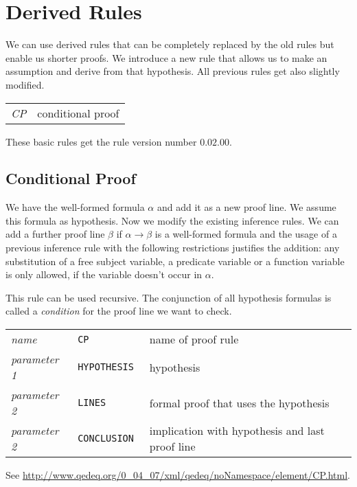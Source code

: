 \documentclass[a4paper,german,10pt,twoside]{book}
\theoremstyle{definition}
\theoremstyle{remark}
\begin{document}

\chapter{Derived Rules} \label{chapter7} \hypertarget{chapter7}{}

We can use derived rules that can be completely replaced by the old rules but enable us shorter proofs. We introduce a new rule that allows us to make an assumption and derive from that hypothesis. All previous rules get also slightly modified.

\par
\begin{tabularx}{\columnwidth}{ll}
  \emph{CP}          & conditional proof  \\
\end{tabularx}
  
\par
These basic rules get the rule version number $0.02.00$.

\section{Conditional Proof} \label{chapter7_section1} \hypertarget{chapter7_section1}{}
We have the well-formed formula $\alpha$ and add it as a new proof line. We assume this formula as hypothesis. Now we modify the existing inference rules. We can add a further proof line $\beta$ if $\alpha \rightarrow \beta$ is a well-formed formula and the usage of a previous inference rule with the following restrictions justifies the addition: any substitution of a free subject variable, a predicate variable or a function variable is only allowed, if the variable doesn't occur in $\alpha$.

\par
This rule can be used recursive. The conjunction of all hypothesis formulas is called a \emph{condition} for the proof line we want to check.

\par
\begin{tabularx}{\columnwidth}{lll}
  \emph{name}        & \tt{CP}          & name of proof rule \\
  \emph{parameter 1} & \tt{HYPOTHESIS}  & hypothesis \\
  \emph{parameter 2} & \tt{LINES}       & formal proof that uses the hypothesis\\
  \emph{parameter 2} & \tt{CONCLUSION}  & implication with hypothesis and last proof line
\end{tabularx}

\par
See \url{http://www.qedeq.org/0_04_07/xml/qedeq/noNamespace/element/CP.html}.



 \printindex
\end{document}
